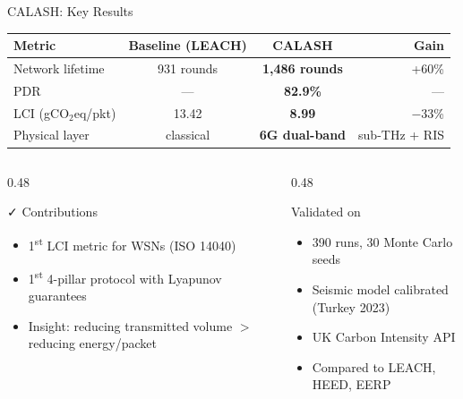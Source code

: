 \documentclass[10pt,aspectratio=169]{beamer}
\begin{document}
\begin{frame}[shrink=8]{CALASH: Key Results}
\centering
\renewcommand{\arraystretch}{1.2}
\begin{tabular}{lccr}
  \toprule
  \textbf{Metric} & \textbf{Baseline (LEACH)} & \textbf{CALASH} & \textbf{Gain} \\
  \midrule
  Network lifetime & 931 rounds & \textbf{1,486 rounds} & +60\% \\
  PDR & --- & \textbf{82.9\%} & --- \\
  LCI (gCO$_2$eq/pkt) & 13.42 & \textbf{8.99} & $-$33\% \\
  Physical layer & classical & \textbf{6G dual-band} & sub-THz + RIS \\
  \bottomrule
\end{tabular}

\vspace{10pt}
\begin{columns}
\begin{column}{0.48\textwidth}
  \begin{exampleblock}{\faCheck\; Contributions}
    \begin{itemize}\small
      \item 1\textsuperscript{st} LCI metric for WSNs (ISO 14040)
      \item 1\textsuperscript{st} 4-pillar protocol with Lyapunov guarantees
      \item Insight: reducing transmitted volume $>$ reducing energy/packet
    \end{itemize}
  \end{exampleblock}
\end{column}
\begin{column}{0.48\textwidth}
  \begin{block}{Validated on}
    \begin{itemize}\small
      \item 390 runs, 30 Monte Carlo seeds
      \item Seismic model calibrated (Turkey 2023)
      \item UK Carbon Intensity API
      \item Compared to LEACH, HEED, EERP
    \end{itemize}
  \end{block}
\end{column}
\end{columns}
\end{frame}
\end{document}
